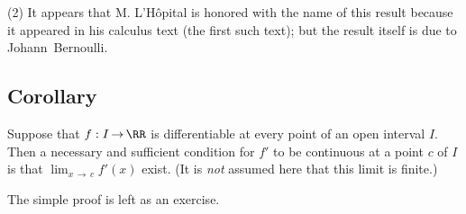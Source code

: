         (2) It appears that M. L'H\^{o}pital is honored with the name of this result because it appeared in his calculus text (the first such text);
    but the result itself is due to Johann~Bernoulli.

\V

            \subsection{\small{\bf Corollary}}
            \label{CorE50.80}

        Suppose that $f:I \,{\rightarrow}\, {\RR}$ is differentiable at every point of an open interval $I$.
    Then a necessary and sufficient condition for $f'$ to be continuous at a point $c$ of $I$ is that ${\displaystyle \lim_{x \,{\rightarrow}\, c}} f'(x)$ exist.
    (It is {\em not} assumed here that this limit is finite.)

\V

        The simple proof is left as an exercise. \Q

\VV

